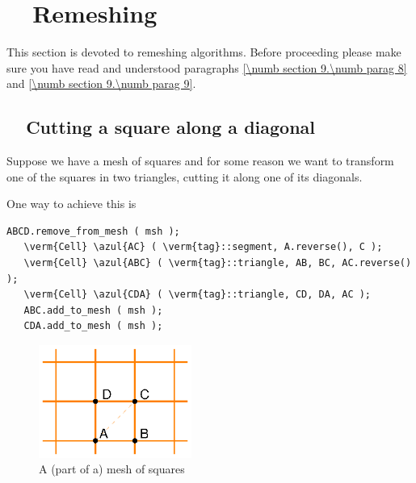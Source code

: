 
\chapter{~~Remeshing}\label{\numb section 10}

This section is devoted to remeshing algorithms.
Before proceeding please make sure you have read and understood paragraphs
\ref{\numb section 9.\numb parag 8} and \ref{\numb section 9.\numb parag 9}.


\section{~~Cutting a square along a diagonal}\label{\numb section 10.\numb parag 1}

Suppose we have a mesh of squares and for some reason we want to transform one of the
squares in two triangles, cutting it along one of its diagonals.

One way to achieve this is

\begin{Verbatim}[commandchars=\\\{\},formatcom=\small\tt,frame=single,
   label=main-\ref{\numb section 10.\numb parag 1}.cpp,rulecolor=\color{coment},
   baselinestretch=0.94,framesep=2mm]
   ABCD.remove_from_mesh ( msh );
   \verm{Cell} \azul{AC} ( \verm{tag}::segment, A.reverse(), C );
   \verm{Cell} \azul{ABC} ( \verm{tag}::triangle, AB, BC, AC.reverse() );
   \verm{Cell} \azul{CDA} ( \verm{tag}::triangle, CD, DA, AC );
   ABC.add_to_mesh ( msh );
   CDA.add_to_mesh ( msh );
\end{Verbatim}

\begin{figure}[ht] \centering
  \includegraphics[width=50mm]{malha-quadr}
  \caption{A (part of a) mesh of squares}
  \label{\numb section 10.\numb fig 1}
\end{figure}

